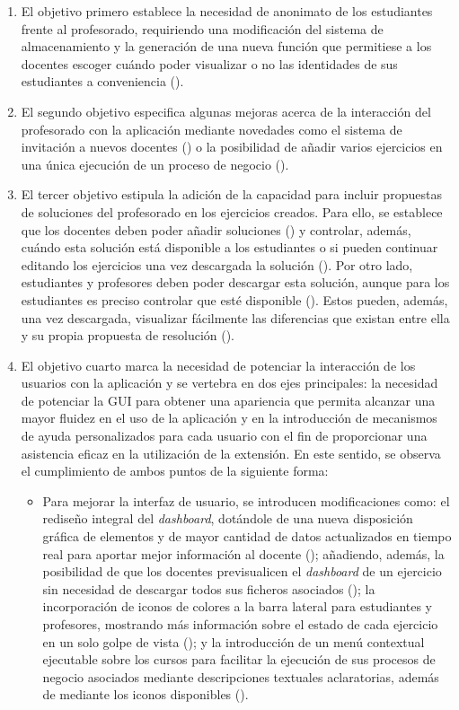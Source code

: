 \begin{enumerate}
    \item El objetivo primero establece la necesidad de anonimato de los estudiantes frente al profesorado, requiriendo una modificación del sistema de almacenamiento y la generación de una nueva función que permitiese a los docentes escoger cuándo poder visualizar o no las identidades de sus estudiantes a conveniencia ().
    \item El segundo objetivo especifica algunas mejoras acerca de la interacción del profesorado con la aplicación mediante novedades como el sistema de invitación a nuevos docentes () o la posibilidad de añadir varios ejercicios en una única ejecución de un proceso de negocio ().
    \item El tercer objetivo estipula la adición de la capacidad para incluir propuestas de soluciones del profesorado en los ejercicios creados. Para ello, se establece que los docentes deben poder añadir soluciones () y controlar, además, cuándo esta solución está disponible a los estudiantes o si pueden continuar editando los ejercicios una vez descargada la solución (). Por otro lado, estudiantes y profesores deben poder descargar esta solución, aunque para los estudiantes es preciso controlar que esté disponible (). Estos pueden, además, una vez descargada, visualizar fácilmente las diferencias que existan entre ella y su propia propuesta de resolución ().
    \item El objetivo cuarto marca la necesidad de potenciar la interacción de los usuarios con la aplicación y se vertebra en dos ejes principales: la necesidad de potenciar la GUI para obtener una apariencia que permita alcanzar una mayor fluidez en el uso de la aplicación y en la introducción de mecanismos de ayuda personalizados para cada usuario con el fin de proporcionar una asistencia eficaz en la utilización de la extensión. En este sentido, se observa el cumplimiento de ambos puntos de la siguiente forma:
    \begin{itemize}
        \item Para mejorar la interfaz de usuario, se introducen modificaciones como: el rediseño integral del \textit{dashboard}, dotándole de una nueva disposición gráfica de elementos y de mayor cantidad de datos actualizados en tiempo real para aportar mejor información al docente (); añadiendo, además, la posibilidad de que los docentes previsualicen el \textit{dashboard} de un ejercicio sin necesidad de descargar todos sus ficheros asociados (); la incorporación de iconos de colores a la barra lateral para estudiantes y profesores, mostrando más información sobre el estado de cada ejercicio en un solo golpe de vista (); y la introducción de un menú contextual ejecutable sobre los cursos para facilitar la ejecución de sus procesos de negocio asociados mediante descripciones textuales aclaratorias, además de mediante los iconos disponibles ().

\end{itemize}
\end{enumerate}

